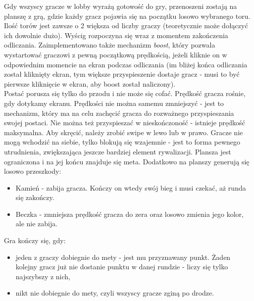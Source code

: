 \documentclass[]{report}
\begin{document}
Gdy wszyscy gracze w lobby wyrażą gotowość do gry, przenoszeni zostają na planszę z grą, gdzie każdy gracz pojawia się na początku losowo wybranego toru. Ilość torów jest zawsze o 2 większa od liczby graczy (teoretycznie może dołączyć ich dowolnie dużo).
Wyścig rozpoczyna się wraz z momentem zakończenia odliczania. Zaimplementowano także mechanizm \textit{boost}, który pozwala wystartować graczowi z pewną początkową prędkością, jeżeli kliknie on w odpowiednim momencie na ekran podczas odliczania (im bliżej końca odliczania został kliknięty ekran, tym większe przyspieszenie dostaje gracz - musi to być pierwsze kliknięcie w ekran, aby boost został naliczony).\\
Postać porusza się tylko do przodu i nie może się cofać. Prędkość gracza rośnie, gdy dotykamy ekranu. Prędkości nie można samemu zmniejszyć - jest to mechanizm, który ma na celu zachęcić gracza do rozważnego przyspieszania swojej postaci. Nie można też przyspieszać w nieskończoność - istnieje prędkość maksymalna. Aby skręcić, należy zrobić swipe w lewo lub w prawo. Gracze nie mogą wchodzić na siebie, tylko blokują się wzajemnie - jest to forma pewnego utrudnienia, zwiększająca jeszcze bardziej element rywalizacji. Plansza jest ograniczona i na jej końcu znajduje się meta. Dodatkowo na planszy generują się losowo przeszkody:
\begin{itemize}
	\item Kamień - zabija gracza. Kończy on wtedy swój bieg i musi czekać, aż runda się zakończy.
	\item Beczka - zmniejsza prędkość gracza do zera oraz losowo zmienia jego kolor, ale nie zabija.
\end{itemize}
Gra kończy się, gdy:
\begin{itemize}
	\item jeden z graczy dobiegnie do mety - jest mu przyznawany punkt. Żaden kolejny gracz już nie dostanie punktu w danej rundzie - liczy się tylko najszybszy z nich,
	\item nikt nie dobiegnie do mety, czyli wszyscy gracze zginą po drodze.
\end{itemize}
\end{document}
